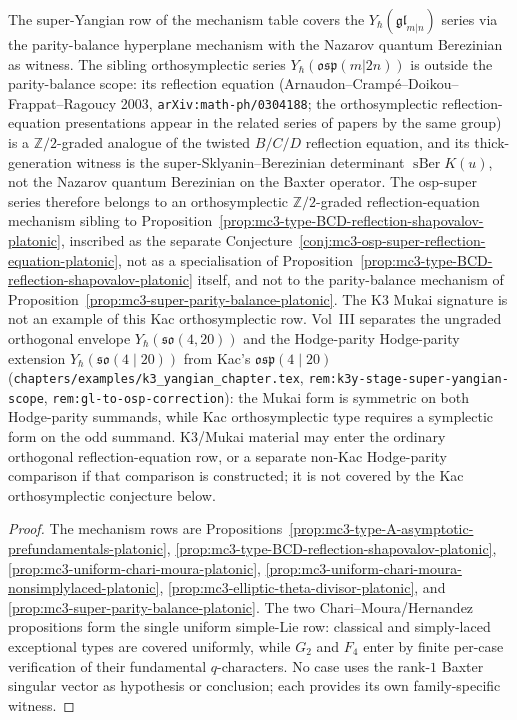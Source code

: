 \begin{remark}
\label{rem:super-yangian-scope}
The super-Yangian row of the mechanism table covers the
$Y_\hbar(\mathfrak{gl}_{m|n})$ series via the parity-balance
hyperplane mechanism with the Nazarov quantum Berezinian as
witness. The sibling orthosymplectic series $Y_\hbar(\mathfrak{osp}(m|2n))$
is outside the parity-balance scope: its reflection equation
(Arnaudon--Cramp\'e--Doikou--Frappat--Ragoucy 2003,
\texttt{arXiv:math-ph/0304188}; the orthosymplectic
reflection-equation presentations appear in the related series of
papers by the same group) is a $\mathbb{Z}/2$-graded analogue of
the twisted $B/C/D$ reflection equation, and its thick-generation
witness is the super-Sklyanin--Berezinian determinant
$\operatorname{sBer} K(u)$, not the Nazarov quantum Berezinian on
the Baxter operator. The osp-super series therefore belongs to
an orthosymplectic $\mathbb{Z}/2$-graded reflection-equation
mechanism sibling to
Proposition~\ref{prop:mc3-type-BCD-reflection-shapovalov-platonic},
inscribed as the separate
Conjecture~\ref{conj:mc3-osp-super-reflection-equation-platonic},
not as a specialisation of
Proposition~\ref{prop:mc3-type-BCD-reflection-shapovalov-platonic}
itself, and not to the parity-balance mechanism of
Proposition~\ref{prop:mc3-super-parity-balance-platonic}.
The K3 Mukai signature is not an example of this Kac
orthosymplectic row.  Vol~III separates the ungraded orthogonal
envelope $Y_\hbar(\mathfrak{so}(4,20))$ and the Hodge-parity
Hodge-parity extension $Y_\hbar(\mathfrak{so}(4\mid20))$ from
Kac's $\mathfrak{osp}(4\mid20)$
\textup{(}\texttt{chapters/examples/k3\_yangian\_chapter.tex},
\texttt{rem:k3y-stage-super-yangian-scope},
\texttt{rem:gl-to-osp-correction}\textup{)}: the Mukai form is
symmetric on both Hodge-parity summands, while Kac orthosymplectic
type requires a symplectic form on the odd summand.  K3/Mukai
material may enter the ordinary orthogonal reflection-equation row,
or a separate non-Kac Hodge-parity comparison if that comparison is
constructed; it is not covered by the Kac orthosymplectic conjecture
below.
\end{remark}

\begin{proof}
The mechanism rows are
Propositions~\ref{prop:mc3-type-A-asymptotic-prefundamentals-platonic},
\ref{prop:mc3-type-BCD-reflection-shapovalov-platonic},
\ref{prop:mc3-uniform-chari-moura-platonic},
\ref{prop:mc3-uniform-chari-moura-nonsimplylaced-platonic},
\ref{prop:mc3-elliptic-theta-divisor-platonic}, and
\ref{prop:mc3-super-parity-balance-platonic}.
The two Chari--Moura/Hernandez propositions form the single uniform
simple-Lie row: classical and simply-laced exceptional types are
covered uniformly, while $G_2$ and $F_4$ enter by finite per-case
verification of their fundamental $q$-characters. No case uses the
rank-$1$ Baxter singular vector as hypothesis or conclusion; each
provides its own family-specific witness.
\end{proof}

